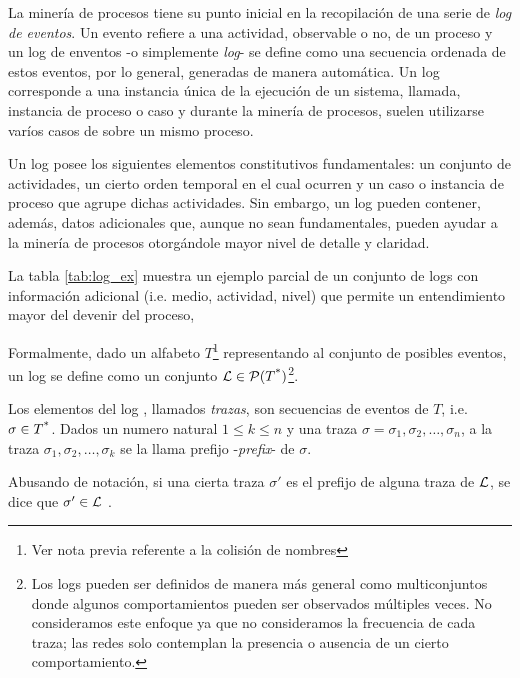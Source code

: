 La minería de procesos tiene su punto inicial en la recopilación de una serie de \textit{log de eventos}. 
Un evento refiere a una actividad, observable o no, de un proceso y
un log de enventos -o simplemente \textit{log}- se define como una secuencia
ordenada de estos eventos, por lo general, generadas de manera automática.
Un log corresponde a una instancia única de la ejecución de un sistema, llamada, instancia de proceso o caso y 
durante la minería de procesos, suelen utilizarse varíos casos de sobre un mismo proceso.

Un log posee los siguientes elementos constitutivos fundamentales: un conjunto de actividades,
un cierto orden temporal en el cual ocurren y un caso o instancia de proceso que agrupe dichas actividades.
Sin embargo, un log pueden contener, además, datos adicionales que, aunque no sean fundamentales, pueden
ayudar a la minería de procesos otorgándole mayor nivel de detalle y claridad.

La tabla \autoref{tab:log_ex} muestra un ejemplo parcial de un conjunto de logs con información adicional (i.e. medio, actividad, nivel) que permite un entendimiento mayor del devenir del proceso,



Formalmente, dado un alfabeto $T$\footnote{Ver nota previa referente a la colisión de nombres} representando
al conjunto de posibles eventos, un log se define como un conjunto ${\mathcal L} \in \mathcal{P}(T\textsuperscript{*})$\footnote{
Los logs pueden ser definidos de manera más general como multiconjuntos donde algunos comportamientos
pueden ser observados múltiples veces. No consideramos este enfoque ya que no consideramos 
la frecuencia de cada traza; las redes solo contemplan la presencia o ausencia de un cierto comportamiento.}. 


Los elementos del log \pmlog, llamados \textit{trazas}, son secuencias de eventos de $T$,
i.e. $\sigma \in T\textsuperscript{*}$.
Dados un numero natural $1 \leq k \leq n$ y una traza $\sigma=\sigma_1,\sigma_2,\dots,\sigma_n$, a la traza
$\sigma_1,\sigma_2,\dots,\sigma_k$ se la llama prefijo -\textit{prefix}- de $\sigma$.

Abusando de notación,  si una cierta traza $\sigma'$ es el prefijo de alguna traza de ${\mathcal L}$, se dice que 
$\sigma' \in {\mathcal L}$ .


